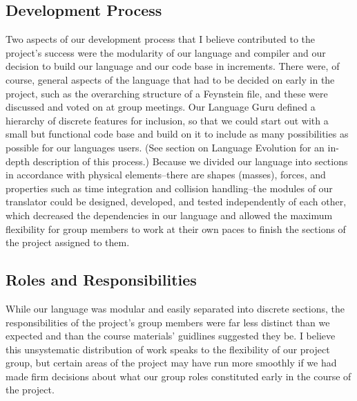 \subsection{Development Process}
Two aspects of our development process that I believe contributed to
the project’s success were the modularity of our language and compiler
and our decision to build our language and our code base in
increments. There were, of course, general aspects of the language
that had to be decided on early in the project, such as the
overarching structure of a Feynstein file, and these were discussed
and voted on at group meetings. Our Language Guru defined a hierarchy
of discrete features for inclusion, so that we could start out with a
small but functional code base and build on it to include as many
possibilities as possible for our languages users. (See section on
Language Evolution for an in-depth description of this process.)
Because we divided our language into sections in accordance with
physical elements--there are shapes (masses), forces, and properties
such as time integration and collision handling--the modules of our
translator could be designed, developed, and tested independently of
each other, which decreased the dependencies in our language and
allowed the maximum flexibility for group members to work at their own
paces to finish the sections of the project assigned to them.

\subsection{Roles and Responsibilities}
While our language was modular and easily separated into discrete sections,
the responsibilities of the project's group members were far less
distinct than we expected and than the course materials' guidlines
suggested they be. I believe this unsystematic distribution of work
speaks to the flexibility of our project group, but certain areas of the
project may have run more smoothly if we had made firm decisions
about what our group roles constituted early in the course of the project.

